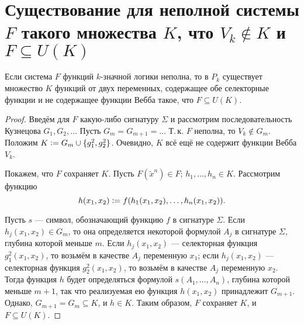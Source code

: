 \section{Существование для неполной системы $F$ такого множества $K$, что $V_k \notin K$ и $F \subseteq U(K)$}

\begin{lemma}
    Если система $F$ функций $k$-значной логики неполна, то в $P_k$ существует множество $K$ функций от двух переменных, содержащее обе селекторные функции и не содержащее функции Вебба такое, что $F \subseteq U(K)$.
\end{lemma}

\begin{proof}
    Введём для $F$ какую-либо сигнатуру $\Sigma$ и рассмотрим последовательность Кузнецова $G_1, G_2, \ldots$ Пусть $G_m = G_{m + 1} = \ldots$ Т.\,к. $F$ неполна, то $V_k \notin G_m$. Положим $K \vcentcolon = G_m \cup \{g_1^2, g_2^2\}$. Очевидно, $K$ всё ещё не содержит функции Вебба $V_k$.

    Покажем, что $F$ сохраняет $K$. Пусть $F(\widetilde{x}^n) \in F$; $h_1, \ldots, h_n \in K$. Рассмотрим функцию
    \[
        h(x_1, x_2) \vcentcolon = f(h_1(x_1, x_2), \ldots, h_n(x_1, x_2)).
    \]

    Пусть $s$ --- символ, обозначающий функцию $f$ в сигнатуре $\Sigma$. Если $h_j(x_1, x_2) \in G_m$, то она определяется некоторой формулой $A_j$ в сигнатуре $\Sigma$, глубина которой меньше $m$. Если $h_j(x_1, x_2)$ --- селекторная функция $g^2_1(x_1, x_2)$, то возьмём в качестве $A_j$ переменную $x_1$; если $h_j(x_1, x_2)$ --- селекторная функция $g^2_2(x_1, x_2)$, то возьмём в качестве $A_j$ переменную $x_2$. Тогда функция $h$ будет определяться формулой $s(A_1, \ldots, A_n)$, глубина которой меньше $m + 1$, так что реализуемая ею функция $h(x_1, x_2)$ принадлежит $G_{m + 1}$. Однако, $G_{m + 1} = G_m \subseteq K$, и $h \in K$. Таким образом, $F$ сохраняет $K$, и $F \subseteq U(K)$.
\end{proof}

